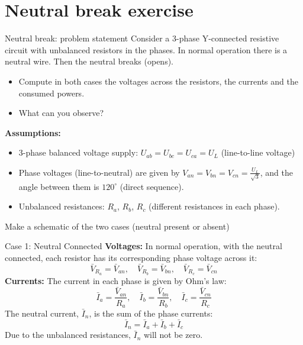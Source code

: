 \section{Neutral break exercise}
\begin{frame}[allowframebreaks]{Neutral break: problem statement}
    Consider a 3-phase Y-connected resistive circuit with unbalanced resistors in the phases. In normal operation there is a neutral wire. Then the neutral breaks (opens).
    \begin{itemize}
        \item Compute in both cases the voltages across the resistors, the currents and the consumed powers.
        \item What can you observe?
    \end{itemize}
    \textbf{Assumptions:}
    \begin{itemize}
        \item 3-phase balanced voltage supply: $U_{ab} = U_{bc} = U_{ca} = U_L$ (line-to-line voltage)
        \item Phase voltages (line-to-neutral) are given by $V_{an} = V_{bn} = V_{cn} = \frac{U_L}{\sqrt{3}}$, and the angle between them is $120^\circ$ (direct sequence).
        \item Unbalanced resistances: $R_a$, $R_b$, $R_c$ (different resistances in each phase).
    \end{itemize}

    \begin{block}{Make a schematic of the two cases (neutral present or absent)}
        \vspace{3cm}
    \end{block}
\end{frame}

\begin{frame}{Case 1: Neutral Connected}
    \textbf{Voltages:} In normal operation, with the neutral connected, each resistor has its corresponding phase voltage across it:
    $$\bar{V}_{R_a} = \bar{V}_{an}, \quad \bar{V}_{R_b} = \bar{V}_{bn}, \quad \bar{V}_{R_c} = \bar{V}_{cn}$$
    \textbf{Currents:} The current in each phase is given by Ohm's law:
    $$\bar{I}_a = \frac{\bar{V}_{an}}{R_a}, \quad \bar{I}_b = \frac{\bar{V}_{bn}}{R_b}, \quad \bar{I}_c = \frac{\bar{V}_{cn}}{R_c}$$
    The neutral current, $\bar{I}_n$, is the sum of the phase currents:
    $$\bar{I}_n = \bar{I}_a + \bar{I}_b + \bar{I}_c$$
    Due to the unbalanced resistances, $\bar{I}_n$ will not be zero.
\end{frame}

